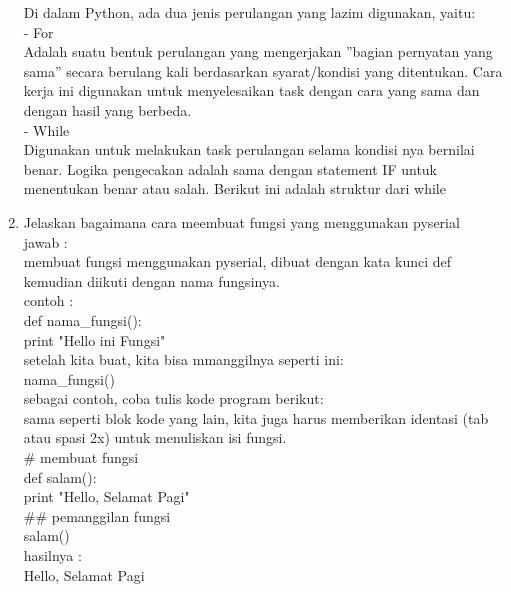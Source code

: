 \begin{enumerate}
Di dalam Python, ada dua jenis perulangan yang lazim digunakan, yaitu:\\

- For\\
Adalah suatu bentuk perulangan yang mengerjakan ”bagian pernyatan yang sama” secara berulang kali berdasarkan syarat/kondisi yang ditentukan. Cara kerja ini digunakan untuk menyelesaikan task dengan cara yang sama dan dengan hasil yang berbeda.\\

- While\\
Digunakan  untuk melakukan task perulangan selama kondisi nya bernilai benar. Logika pengecakan adalah sama dengan statement IF untuk menentukan benar atau salah. Berikut ini adalah struktur dari while\\

\item Jelaskan bagaimana cara meembuat fungsi yang menggunakan pyserial\\
jawab :\\
membuat fungsi menggunakan pyserial, dibuat dengan kata kunci def kemudian diikuti dengan nama fungsinya.\\
contoh :\\
def nama\_fungsi():\\
	print "Hello ini Fungsi"\\

setelah kita buat, kita bisa mmanggilnya seperti ini:\\
nama\_fungsi()\\
sebagai contoh, coba tulis kode program berikut:\\
sama seperti blok kode yang lain, kita juga harus memberikan identasi (tab atau spasi 2x) untuk menuliskan isi fungsi.\\

\# membuat fungsi\\
def salam():\\
	print "Hello, Selamat Pagi"\\
\#\# pemanggilan fungsi\\
salam()\\
hasilnya : \\
Hello, Selamat Pagi\\

\end{enumerate}
